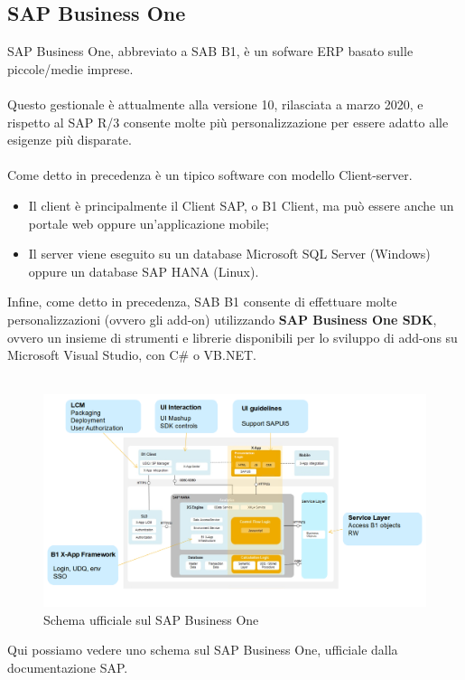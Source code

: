 \subsection{SAP Business One}
SAP Business One, abbreviato a SAB B1, è un sofware ERP basato sulle piccole/medie imprese.
\\\\Questo gestionale è attualmente alla versione 10, rilasciata a marzo 2020, e rispetto al SAP R/3 consente molte più personalizzazione per essere adatto alle esigenze più disparate.
\\\\Come detto in precedenza è un tipico software con modello Client-server.
\begin{itemize}
	\item Il client è principalmente il Client SAP, o B1 Client, ma può essere anche un portale web oppure un'applicazione mobile;
	\item Il server viene eseguito su un database Microsoft SQL Server (Windows) oppure un database SAP HANA (Linux).\\
\end{itemize}
Infine, come detto in precedenza, SAB B1 consente di effettuare molte personalizzazioni (ovvero gli add-on) utilizzando \textbf{SAP Business One SDK}, ovvero un insieme di strumenti e librerie disponibili per lo sviluppo di add-ons su Microsoft Visual Studio, con C\# o VB.NET.\\\\
\begin{figure}[!h] 
	\includegraphics[scale = 0.4, left]{immagini/erp-sap-inside.png} 
	\caption{Schema ufficiale sul SAP Business One}
\end{figure}
\newpage
Qui possiamo vedere uno schema sul SAP Business One, ufficiale dalla documentazione SAP.\\
